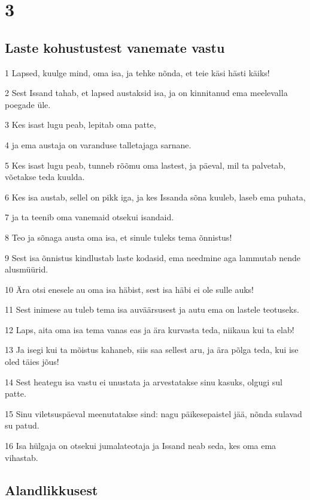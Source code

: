\chapter{3}

\section*{Laste kohustustest vanemate vastu}

\par 1 Lapsed, kuulge mind, oma isa, ja tehke nõnda, et teie käsi hästi käiks!
\par 2 Sest Issand tahab, et lapsed austaksid isa, ja on kinnitanud ema meelevalla poegade üle.
\par 3 Kes isast lugu peab, lepitab oma patte,
\par 4 ja ema austaja on varanduse talletajaga sarnane.
\par 5 Kes isast lugu peab, tunneb rõõmu oma lastest, ja päeval, mil ta palvetab, võetakse teda kuulda.
\par 6 Kes isa austab, sellel on pikk iga, ja kes Issanda sõna kuuleb, laseb ema puhata,
\par 7 ja ta teenib oma vanemaid otsekui isandaid.
\par 8 Teo ja sõnaga austa oma isa, et sinule tuleks tema õnnistus!
\par 9 Sest isa õnnistus kindlustab laste kodasid, ema needmine aga lammutab nende alusmüürid.
\par 10 Ära otsi enesele au oma isa häbist, sest isa häbi ei ole sulle auks!
\par 11 Sest inimese au tuleb tema isa auväärsusest ja autu ema on lastele teotuseks.
\par 12 Laps, aita oma isa tema vanas eas ja ära kurvasta teda, niikaua kui ta elab!
\par 13 Ja isegi kui ta mõistus kahaneb, siis saa sellest aru, ja ära põlga teda, kui ise oled täies jõus!
\par 14 Sest heategu isa vastu ei unustata ja arvestatakse sinu kasuks, olgugi sul patte.
\par 15 Sinu viletsuspäeval meenutatakse sind: nagu päikesepaistel jää, nõnda sulavad su patud.
\par 16 Isa hülgaja on otsekui jumalateotaja ja Issand neab seda, kes oma ema vihastab.

\section*{Alandlikkusest}

